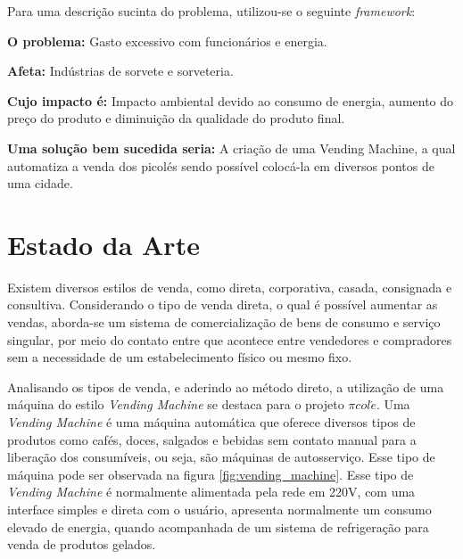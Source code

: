 Para uma descrição sucinta do problema, utilizou-se o seguinte \textit{framework}:

\textbf{O problema:} Gasto excessivo com funcionários e energia.

\textbf{Afeta:} Indústrias de sorvete e sorveteria.

\textbf{Cujo impacto é:} Impacto ambiental devido ao consumo de energia, aumento do preço do produto e diminuição da qualidade do produto final.

\textbf{Uma solução bem sucedida seria:} A criação de uma Vending Machine, a qual automatiza a venda dos picolés sendo possível colocá-la em diversos pontos de uma cidade.

\section{Estado da Arte}

Existem diversos estilos de venda, como direta, corporativa, casada, consignada e consultiva. Considerando o tipo de venda direta, o qual é possível aumentar as vendas, aborda-se um sistema de comercialização de bens de consumo e serviço singular, por meio do contato entre que acontece entre vendedores e compradores sem a necessidade de um estabelecimento físico ou mesmo fixo. \cite {MARQUES}

	Analisando os tipos de venda, e aderindo ao método direto, a utilização de uma máquina do estilo \textit{Vending Machine} se destaca para o projeto $\pi col\acute{e}$. Uma \textit{Vending Machine} é uma máquina automática que oferece diversos tipos de produtos como cafés, doces, salgados e bebidas sem contato manual para a liberação dos consumíveis, ou seja, são máquinas de autosserviço. Esse tipo de máquina pode ser observada na figura \ref{fig:vending_machine}.
	Esse tipo de \textit{Vending Machine} é normalmente alimentada pela rede em 220V, com uma interface simples e direta com o usuário, apresenta normalmente um consumo elevado de energia, quando acompanhada de um sistema de refrigeração para venda de produtos gelados.


